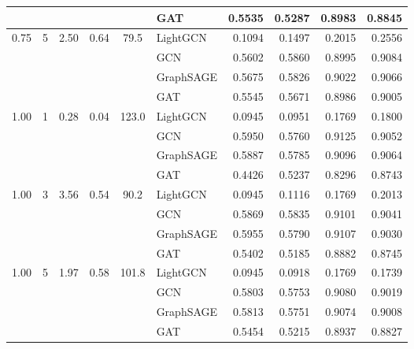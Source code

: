 {\begin{longtable}{cccccl rrrr}
 & & & & & GAT & 0.5535 & 0.5287 & 0.8983 & 0.8845 \\
\midrule
\multirow{4}{*}{0.75} & \multirow{4}{*}{5} & \multirow{4}{*}{2.50} & \multirow{4}{*}{0.64} & \multirow{4}{*}{79.5} & LightGCN & 0.1094 & 0.1497 & 0.2015 & 0.2556 \\
 & & & & & GCN & 0.5602 & 0.5860 & 0.8995 & 0.9084 \\
 & & & & & GraphSAGE & 0.5675 & 0.5826 & 0.9022 & 0.9066 \\
 & & & & & GAT & 0.5545 & 0.5671 & 0.8986 & 0.9005 \\
\midrule
\multirow{4}{*}{1.00} & \multirow{4}{*}{1} & \multirow{4}{*}{0.28} & \multirow{4}{*}{0.04} & \multirow{4}{*}{123.0} & LightGCN & 0.0945 & 0.0951 & 0.1769 & 0.1800 \\
 & & & & & GCN & 0.5950 & 0.5760 & 0.9125 & 0.9052 \\
 & & & & & GraphSAGE & 0.5887 & 0.5785 & 0.9096 & 0.9064 \\
 & & & & & GAT & 0.4426 & 0.5237 & 0.8296 & 0.8743 \\
\midrule
\multirow{4}{*}{1.00} & \multirow{4}{*}{3} & \multirow{4}{*}{3.56} & \multirow{4}{*}{0.54} & \multirow{4}{*}{90.2} & LightGCN & 0.0945 & 0.1116 & 0.1769 & 0.2013 \\
 & & & & & GCN & 0.5869 & 0.5835 & 0.9101 & 0.9041 \\
 & & & & & GraphSAGE & 0.5955 & 0.5790 & 0.9107 & 0.9030 \\
 & & & & & GAT & 0.5402 & 0.5185 & 0.8882 & 0.8745 \\
\midrule
\multirow{4}{*}{1.00} & \multirow{4}{*}{5} & \multirow{4}{*}{1.97} & \multirow{4}{*}{0.58} & \multirow{4}{*}{101.8} & LightGCN & 0.0945 & 0.0918 & 0.1769 & 0.1739 \\
 & & & & & GCN & 0.5803 & 0.5753 & 0.9080 & 0.9019 \\
 & & & & & GraphSAGE & 0.5813 & 0.5751 & 0.9074 & 0.9008 \\
 & & & & & GAT & 0.5454 & 0.5215 & 0.8937 & 0.8827 \\
\midrule
\end{longtable}
}

